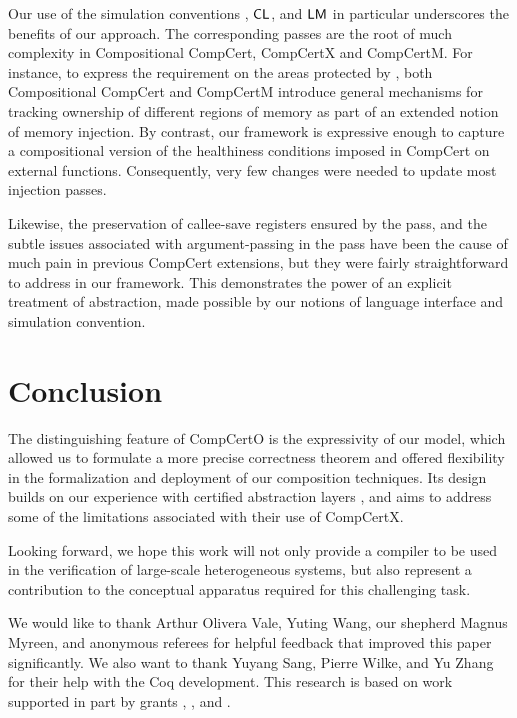 \documentclass[sigplan,screen]{acmart}
\begin{document}
Our use of the simulation conventions
, ${  \mathsf{CL}  }$, and ${  \mathsf{LM}  }$
in particular
underscores the benefits of our approach.
The corresponding passes are the root of
much complexity
in Compositional CompCert, CompCertX and CompCertM.
For instance,
to express the requirement on
the areas protected by ,
both Compositional CompCert and CompCertM
introduce general mechanisms for tracking ownership of
different regions of memory
as part of an extended notion of memory injection.
By contrast,
our framework is expressive enough to capture
a compositional version of the healthiness conditions
imposed in CompCert on external functions.
Consequently,
very few changes were needed to update most injection passes.

Likewise, the preservation of callee-save registers
ensured by the  pass,
and the subtle issues associated with argument-passing
in the  pass
have been the cause of much pain
in previous CompCert extensions,
but they were fairly straightforward to address
in our framework.
This
demonstrates the power of
an explicit treatment of abstraction,
made possible
by our notions of language interface and simulation convention.



\section{Conclusion} \label{sec:concl} %

The distinguishing feature of CompCertO
is the expressivity of our model,
which allowed us to formulate a more precise correctness theorem
and offered flexibility
in the formalization and deployment of
our composition techniques.
Its design builds on our experience with
certified abstraction layers \cite{popl15,ccal,rbgs-cal},
and aims to address some of the limitations
associated with their use of CompCertX.

Looking forward,
we hope this work will not only
provide a compiler
to be used in the verification of
large-scale heterogeneous systems,
but also represent a contribution
to the conceptual apparatus
required for this challenging task.


\begin{acks}
We would like to thank Arthur Olivera Vale,
Yuting Wang, our shepherd Magnus Myreen,
and anonymous referees 
for helpful feedback that
improved this paper significantly. We also want to thank
Yuyang Sang, Pierre Wilke, and Yu Zhang
for their help with the Coq development.
This research is based on work supported in part by
 grants
,
, and
.
\end{acks}
\end{document}
